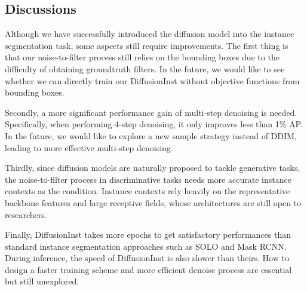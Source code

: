 \documentclass{article}
\begin{document}
\subsection{Discussions}\label{discuss}
Although we have successfully introduced the diffusion model into the instance segmentation task, some aspects still require improvements. The first thing is that our noise-to-filter process still relies on the bounding boxes due to the difficulty of obtaining groundtruth filters. In the future, we would like to see whether we can directly train our DiffusionInst without objective functions from bounding boxes. 





Secondly, a more significant performance gain of multi-step denoising is needed. Specifically, when performing 4-step denoising, it only improves less than 1\% AP. In the future, we would like to explore a new sample strategy instead of DDIM, leading to more effective multi-step denoising.

Thirdly, since diffusion models are naturally proposed to tackle generative tasks, the noise-to-filter process in discriminative tasks needs more accurate instance contexts as the condition. Instance contexts rely heavily on the representative backbone features and large receptive fields, whose architectures are still open to researchers.

Finally, DiffusionInst takes more epochs to get satisfactory performances than standard instance segmentation approaches such as SOLO and Mask RCNN. During inference, the speed of DiffusionInst is also slower than theirs. How to design a faster training scheme and more efficient denoise process are essential but still unexplored.
\end{document}
